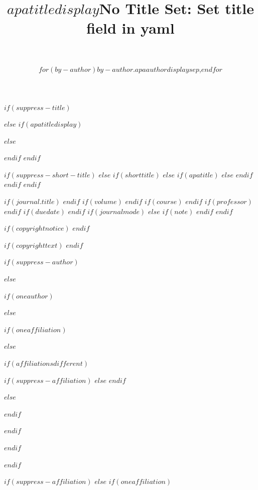 $if(suppress-title)$
\title{}
$else$
$if(apatitledisplay)$
\title{$apatitledisplay$}
$else$
\title{No Title Set: Set title field in yaml}
$endif$
$endif$


$if(suppress-short-title)$
\shorttitle{}
$else$
$if(shorttitle)$
$else$
$if(apatitle)$
$else$
$endif$
$endif$
$endif$


\usepackage{etoolbox}


$if(journal.title)$
$endif$
$if(volume)$
$endif$
$if(course)$
$endif$
$if(professor)$
$endif$
$if(duedate)$
$endif$
$if(journalmode)$
$else$
$if(note)$
$endif$
$endif$

$if(copyrightnotice)$
$endif$

$if(copyrighttext)$
$endif$

$if(suppress-author)$
\author{~}
$else$

$if(oneauthor)$
\author{$for(by-author)$$by-author.apaauthordisplay$$sep$,$endfor$}
$else$

$if(oneaffiliation)$


$else$

$if(affiliationsdifferent)$

$if(suppress-affiliation)$
$else$
$endif$


$else$


$endif$

$endif$

$endif$

$endif$

$if(suppress-affiliation)$
\affiliation{}
$else$
$if(oneaffiliation)$


